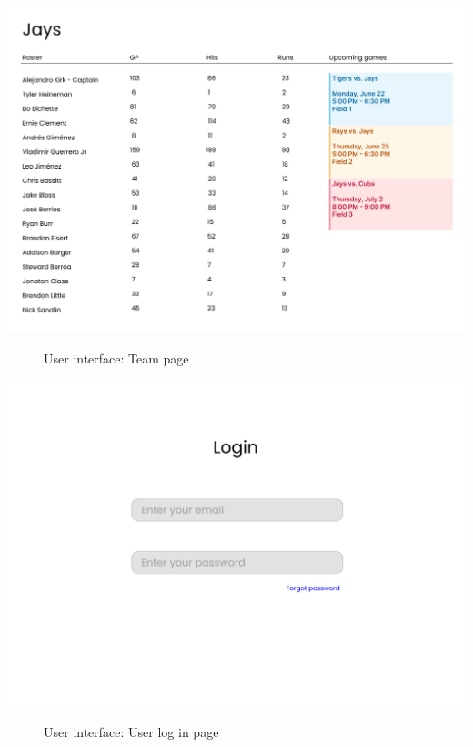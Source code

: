 \documentclass[12pt, titlepage]{article}
\begin{document}
\centering
\includegraphics[scale=0.5]{Figma3.png}
\begin{figure}[H]
\centering
\caption{User interface: Team page}
\label{FigSS}
\end{figure}

\centering
\includegraphics[scale=0.6]{Figma4.png}
\begin{figure}[H]
\centering
\caption{User interface: User log in page}
\label{FigSS}
\end{figure}
\end{document}
